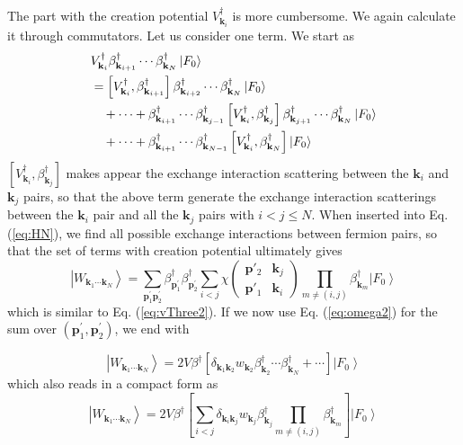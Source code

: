 \documentclass[epj]{svjour}
\newcommand{\vk}{\ensuremath{\mathbf{k}}}
\newcommand{\vp}{\ensuremath{\mathbf{p}}}
\begin{document}
 The part with the creation potential $V^\dagger_{\mathbf{k}_i}$ is more cumbersome.  We again calculate it through commutators.  Let us consider one term. We start as
\begin{equation}
\begin{split}
&V^{\dagger}_{\mathbf{k} _{i}}\beta^{\dagger}_{\mathbf{k} _{i+1}}\cdots\beta^{\dagger}_{\mathbf{k}
_N}\left|F_0\right> \\
&=\left[V^{\dagger}_{\mathbf{k} _{i}},\beta^{\dagger}_{\mathbf{k} _{i+1}}\right]  \beta^{\dagger}_{%
\mathbf{k} _{i+2}}\cdots\beta^{\dagger}_{\mathbf{k} _N}\left|F_0\right> \\
&\quad+\cdots+\beta^{\dagger}_{\mathbf{k} _{i+1}}\cdots\beta^{\dagger}_{\mathbf{k} _{j-1}}
\left[V^{\dagger}_{\mathbf{k} _{i}},\beta^{\dagger}_{\mathbf{k} _j}\right]  \beta^{\dagger}_{\mathbf{k}
_{j+1}}\cdots \beta^{\dagger}_{\mathbf{k}_{N}}\left|F_0\right>\\
&\quad+\cdots+\beta^{\dagger}_{\mathbf{k} _{i+1}}\cdots\beta^{\dagger}_{\mathbf{k} _{N-1}}
\left[V^{\dagger}_{\mathbf{k} _{i}},\beta^{\dagger}_{\mathbf{k} _N}\right] \left|F_0\right>
\end{split}
\end{equation}
 $\left[V^{\dagger}_{\mathbf{k} _{i}},\beta^{\dagger}_{\mathbf{k} _j}\right]$ makes appear the  exchange interaction scattering between the $\vk_i$ and $\vk_j$ pairs, so that the above term generate the exchange interaction scatterings between the $\mathbf{k} _{i}$ pair and all the $\mathbf{k} _{j}$ pairs with  $i<j\leq{N}$.  When inserted into Eq. (\ref{eq:HN}), we find all possible exchange interactions between fermion pairs, so that the set of terms with creation potential ultimately gives
\begin{equation}  
\left|W_{\mathbf{k} _1\cdots\mathbf{k} _N}\right>=\sum_{\vp^{\prime}_1\mathbf{p} ^{\prime}_2}\beta^{\dagger}_{\mathbf{p}
^{\prime}_1}\beta^{\dagger}_{\mathbf{p} ^{\prime}_2} \sum_{i<j}\chi\left(\begin{smallmatrix}\vp'_2&\vk_j\\\vp'_1&\vk_i%
\end{smallmatrix}\right)  \prod_{m\neq(i,j)}\beta^{\dagger}_{\mathbf{k} _m} \left|F_0\right>  
\end{equation}
 which is similar to Eq. (\ref{eq:vThree2}).  If we now use Eq. (\ref{eq:omega2}) for the sum over $(\vp^{\prime}_1,\mathbf{p} ^{\prime}_2)$, we end with 
 
  \begin{equation}  
\left|W_{\mathbf{k} _1\cdots\mathbf{k} _N}\right>=2V\beta^\dagger[ \delta_{\vk_1\vk_2}w_{\vk_2}\beta^{\dagger}_{\mathbf{k} _2}\cdots\beta^{\dagger}_{\mathbf{k} _N}+\cdots ]\left|F_0\right>  
\end{equation}
which also reads in a compact form as 
 \begin{equation}  
\left|W_{\mathbf{k} _1\cdots\mathbf{k} _N}\right>=2V\beta^\dagger\left[ \sum_{i<j}\delta_{\vk_i\vk_j}w_{\vk_j}\beta^\dagger_{\vk_j}\prod_{m\neq(i,j)}\beta^{\dagger}_{\mathbf{k} _m} \right]\left|F_0\right>  
\end{equation}
\end{document}
